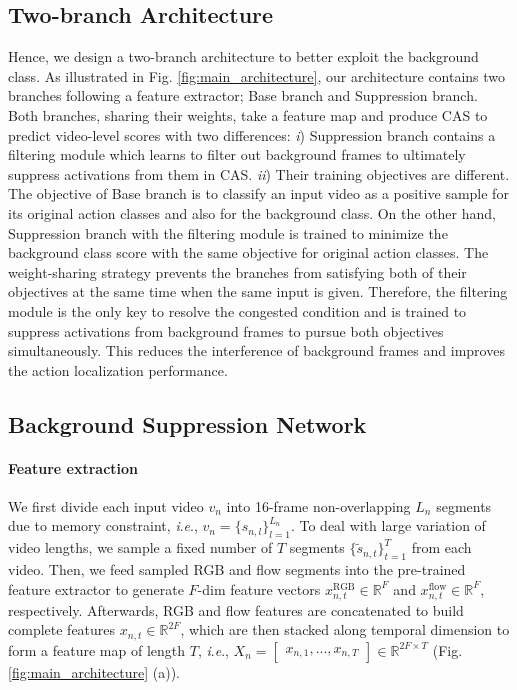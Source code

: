 \documentclass[letterpaper]{article} %
\newcommand{\ie}{\textit{i}.\textit{e}.}
\newcommand{\Fref}[1]{Fig. \ref{#1}}
\newcommand{\R}{\mathbb{R}}
\begin{document}
\subsection{Two-branch Architecture}
Hence, we design a two-branch architecture to better exploit the background class. As illustrated in \Fref{fig:main_architecture}, our architecture contains two branches following a feature extractor; Base branch and Suppression branch. Both branches, sharing their weights, take a feature map and produce CAS to predict video-level scores with two differences:
\textit{i}) Suppression branch contains a filtering module which learns to filter out background frames to ultimately suppress activations from them in CAS.  \textit{ii}) Their training objectives are different. The objective of Base branch is to classify an input video as a positive sample for its original action classes and also for the background class. On the other hand, Suppression branch with the filtering module is trained to minimize the background class score with the same objective for original action classes.
The weight-sharing strategy prevents the branches from satisfying both of their objectives at the same time when the same input is given. Therefore, the filtering module is the only key to resolve the congested condition and is trained to suppress activations from background frames to pursue both objectives simultaneously. This reduces the interference of background frames and improves the action localization performance.

\subsection{Background Suppression Network}

\paragraph{Feature extraction}
We first divide each input video $v_{n}$ into 16-frame non-overlapping $L_{n}$ segments due to memory constraint, \ie, $v_{n}=\{{s}_{n,l}\}^{L_{n}}_{l=1}$. To deal with large variation of video lengths, we sample a fixed number of $T$ segments $\{\tilde{s}_{n, t}\}^{T}_{t=1}$ from each video.
Then, we feed sampled RGB and flow segments into the pre-trained feature extractor to generate $F$-dim feature vectors $x^{\text{RGB}}_{n,t} \in \R^{F}$ and $x^{\text{flow}}_{n,t} \in \R^{F}$, respectively. Afterwards, RGB and flow features are concatenated to build complete features $x_{n,t} \in \mathbb{R}^{2F}$, which are then stacked along temporal dimension to form a feature map of length $T$, \ie, $X_{n} = \begin{bmatrix}x_{n,1}, ..., x_{n,T}\end{bmatrix} \in \mathbb{R}^{2F\times T}$ (\Fref{fig:main_architecture} (a)).
\end{document}
